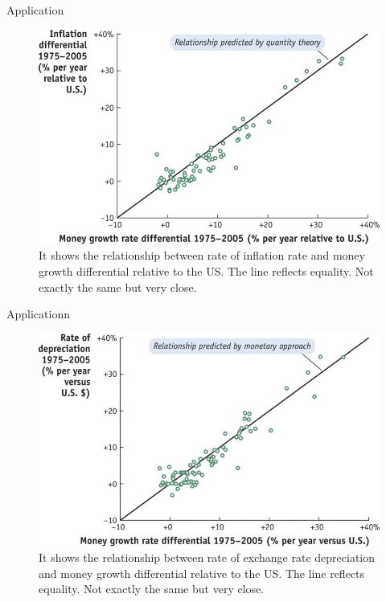 \documentclass[
  ignorenonframetext,
]{beamer}
\begin{document}
\begin{frame}{Application}
\label{application-2}
\begin{figure}[H]

{\centering \includegraphics{Picture3.jpg}

}

\caption{It shows the relationship between rate of inflation rate and
money growth differential relative to the US. The line reflects
equality. Not exactly the same but very close.}

\end{figure}%
\end{frame}

\begin{frame}{Applicationn}
\label{applicationn}
\begin{figure}[H]

{\centering \includegraphics{Picture4.jpg}

}

\caption{It shows the relationship between rate of exchange rate
depreciation and money growth differential relative to the US. The line
reflects equality. Not exactly the same but very close.}

\end{figure}%
\end{frame}
\end{document}
